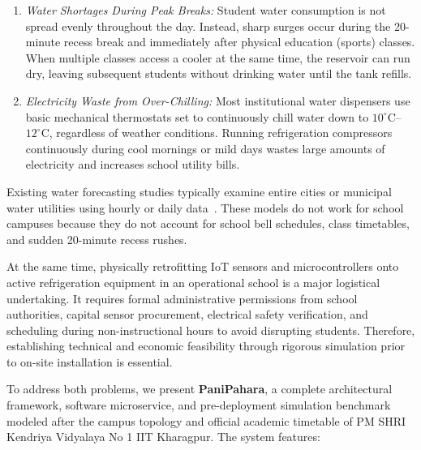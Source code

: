 \documentclass[conference]{IEEEtran}
\begin{document}
\begin{enumerate}
    \item \textit{Water Shortages During Peak Breaks:} Student water consumption is not spread evenly throughout the day. Instead, sharp surges occur during the 20-minute recess break and immediately after physical education (sports) classes. When multiple classes access a cooler at the same time, the reservoir can run dry, leaving subsequent students without drinking water until the tank refills.
    \item \textit{Electricity Waste from Over-Chilling:} Most institutional water dispensers use basic mechanical thermostats set to continuously chill water down to $10^\circ\text{C}$--$12^\circ\text{C}$, regardless of weather conditions. Running refrigeration compressors continuously during cool mornings or mild days wastes large amounts of electricity and increases school utility bills.
\end{enumerate}

Existing water forecasting studies typically examine entire cities or municipal water utilities using hourly or daily data~\cite{donkor2014urban, herrera2010predicting}. These models do not work for school campuses because they do not account for school bell schedules, class timetables, and sudden 20-minute recess rushes.

At the same time, physically retrofitting IoT sensors and microcontrollers onto active refrigeration equipment in an operational school is a major logistical undertaking. It requires formal administrative permissions from school authorities, capital sensor procurement, electrical safety verification, and scheduling during non-instructional hours to avoid disrupting students. Therefore, establishing technical and economic feasibility through rigorous simulation prior to on-site installation is essential.

To address both problems, we present \textbf{PaniPahara}, a complete architectural framework, software microservice, and pre-deployment simulation benchmark modeled after the campus topology and official academic timetable of PM SHRI Kendriya Vidyalaya No 1 IIT Kharagpur. The system features:
\end{document}
